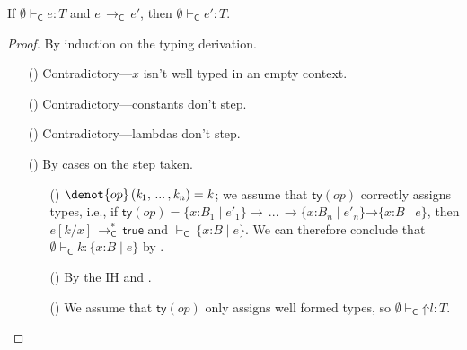 \documentclass[9pt]{extarticle}
\newcommand{\ottnt}[1]{\mathit{#1}}
\newcommand{\ottmv}[1]{\mathit{#1}}
\newcommand{\ottsym}[1]{#1}
\begin{document}
\begin{lemma}
  \label{lem:classicpreservation}
  If $ \emptyset   \vdash _{  \mathsf{C}  }  \ottnt{e}  :  \ottnt{T} $ and $\ottnt{e} \,  \longrightarrow _{  \mathsf{C}  }  \, \ottnt{e'}$, then $ \emptyset   \vdash _{  \mathsf{C}  }  \ottnt{e'}  :  \ottnt{T} $.
\begin{proof}
    By induction on the typing derivation.
{\iffull
    \begin{itemize}
    \item[(\T{Var})] Contradictory---$\mathit{x}$ isn't well typed in an
      empty context.

    \item[(\T{Const})] Contradictory---constants don't step.

    \item[(\T{Abs})] Contradictory---lambdas don't step.

    \item[(\T{Op})] By cases on the step taken.
\begin{itemize}
      \item[(\E{Op})] $\denot{ op } \, \ottsym{(}  \ottnt{k_{{\mathrm{1}}}}  \ottsym{,} \, ... \, \ottsym{,}  \ottnt{k_{\ottmv{n}}}  \ottsym{)}  \ottsym{=}  \ottnt{k}$; we assume that
        $ \mathsf{ty} (\mathord{ \ottnt{op} }) $ correctly assigns types, i.e., if $ \mathsf{ty} (\mathord{ \ottnt{op} })   \ottsym{=}   {}   \{ \mathit{x} \mathord{:} \ottnt{B_{{\mathrm{1}}}} \mathrel{\mid} \ottnt{e'_{{\mathrm{1}}}} \}   \rightarrow \, ... \, \rightarrow   \{ \mathit{x} \mathord{:} \ottnt{B_{\ottmv{n}}} \mathrel{\mid} \ottnt{e'_{\ottmv{n}}} \}   {} \mathord{ \rightarrow }  \{ \mathit{x} \mathord{:} \ottnt{B} \mathrel{\mid} \ottnt{e} \}  $, then $ \ottnt{e}  [  \ottnt{k} / \mathit{x}  ]  \,  \longrightarrow ^{*}_{  \mathsf{C}  }  \,  \mathsf{true} $ and $ \mathord{  \vdash _{  \mathsf{C}  } }~  \{ \mathit{x} \mathord{:} \ottnt{B} \mathrel{\mid} \ottnt{e} \}  $. We can therefore conclude
        that $ \emptyset   \vdash _{  \mathsf{C}  }  \ottnt{k}  :   \{ \mathit{x} \mathord{:} \ottnt{B} \mathrel{\mid} \ottnt{e} \}  $ by .
      \item[(\E{OpInner})] By the IH and .
      \item[(\E{OpRaise})] We assume that $ \mathsf{ty} (\mathord{ \ottnt{op} }) $ only assigns
        well formed types, so $ \emptyset   \vdash _{  \mathsf{C}  }   \mathord{\Uparrow}  \ottnt{l}   :  \ottnt{T} $.
      \end{itemize}


\end{itemize}}
\end{proof}
\end{lemma}
\end{document}
